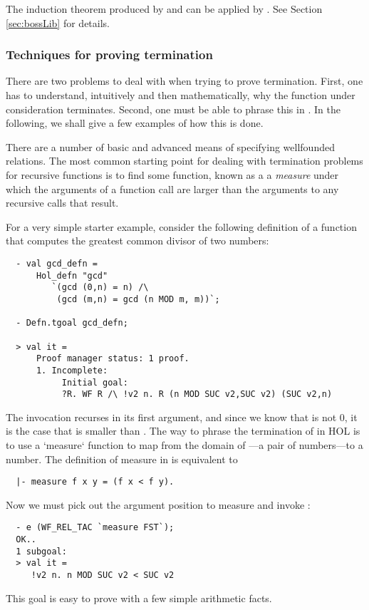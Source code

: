 \noindent The induction theorem produced by  and  can
be applied by . See Section \ref{sec:bossLib} for details.

\subsubsection{Techniques for proving termination}

There are two problems to deal with when trying to prove termination.
First, one has to understand, intuitively and then mathematically,
why the function under consideration terminates. Second, one must
be able to phrase this in \HOL. In the following, we shall give a few
examples of how this is done.

There are a number of basic and advanced means of specifying wellfounded
relations. The most common starting point for dealing with termination
problems for recursive functions is to find some function, known as a a
\emph{measure} under which the arguments of a function call are larger
than the arguments to any recursive calls that result.

For a very simple starter example, consider the following definition
of a function that computes the greatest common divisor of two
numbers:
%
\setcounter{sessioncount}{0}
\begin{session}
\begin{verbatim}
  - val gcd_defn =
      Hol_defn "gcd"
         `(gcd (0,n) = n) /\
          (gcd (m,n) = gcd (n MOD m, m))`;

  - Defn.tgoal gcd_defn;

  > val it =
      Proof manager status: 1 proof.
      1. Incomplete:
           Initial goal:
           ?R. WF R /\ !v2 n. R (n MOD SUC v2,SUC v2) (SUC v2,n)
\end{verbatim}
\end{session}
%
The invocation  recurses in its first argument, and
since we know that  is not 0, it is the case that
 is smaller than \holtxt{m}. The way to phrase the
termination of  in HOL is to use a `measure` function
to map from the domain of \holtxt{gcd}---a pair of numbers---to a number.
The definition of {measure} in \HOL{} is equivalent to
%
\begin{hol}
\begin{verbatim}
  |- measure f x y = (f x < f y).
\end{verbatim}
\end{hol}
%
Now we must pick out the argument position to measure and
invoke :
\begin{session}
\begin{verbatim}
  - e (WF_REL_TAC `measure FST`);
  OK..
  1 subgoal:
  > val it =
     !v2 n. n MOD SUC v2 < SUC v2
\end{verbatim}
\end{session}
%
This goal is easy to prove with a few simple arithmetic facts.

